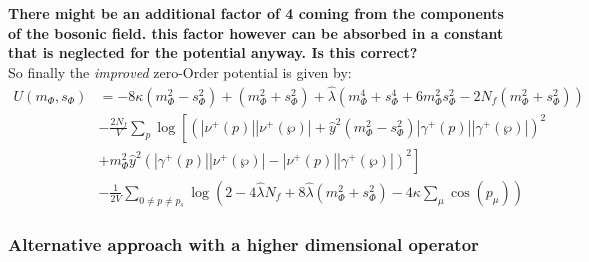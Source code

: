 \textbf{There might be an additional factor of 4 coming from the components of the bosonic field. this factor however can be absorbed in a constant that 
is neglected for the potential anyway. Is this correct?\\}
So finally the \textit{improved} zero-Order potential is given by:
\begin{align}\label{eq:improved_zeroOrderPot}
 U(m_{\Phi}, s_{\Phi}) &= -8 \kappa \left( m_{\Phi}^2 - s_{\Phi}^2 \right)   +   \left( m_{\Phi}^2 + s_{\Phi}^2 \right)
                         + \hat\lambda \left( m_{\Phi}^4 + s_{\Phi}^4 + 6 m_{\Phi}^2 s_{\Phi}^2 - 2 N_f \left(m_{\Phi}^2 + s_{\Phi}^2 \right) \right) 
                           \nonumber \\
                        & -\frac{2N_f}{V} \sum\limits_p \log
                                    \left[ \left( |\nu^+(p)| |\nu^+(\wp)|   +
                                    \hat y ^2 \left( m_{\Phi}^2 - s_{\Phi}^2 \right) |\gamma^+(p)| |\gamma^+(\wp)|\right)^2 
                                    \nonumber \right. \\ 
                        & \left. +  m_{\Phi}^2 \hat y^2 \left( |\gamma^+(p)| |\nu^+(\wp)|   -   |\nu^+(p)| |\gamma^+(\wp)| \right)^2\right]
                        \nonumber \\
                        & - \frac{1}{2V}\sum\limits_{0 \neq p \neq p_s} 
          \log\left( 2 - 4 \hat\lambda N_f + 8 \hat\lambda \left( m_{\Phi}^2 + s_{\Phi}^2  \right) - 4 \kappa \sum_{\mu} \cos(p_{\mu}) \right)
\end{align}
% 
% 
\subsubsection*{Alternative approach with a higher dimensional operator}

